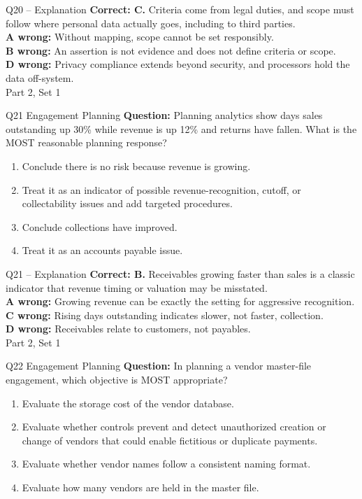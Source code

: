 \documentclass[aspectratio=169,10pt]{beamer}
\begin{document}
\begin{frame}[t]{Q20 -- Explanation}
	\footnotesize
	\textbf{Correct: C.} Criteria come from legal duties, and scope must follow where personal data actually goes, including to third parties. \\[5pt]
\textbf{A wrong:} Without mapping, scope cannot be set responsibly. \\[3pt]
\textbf{B wrong:} An assertion is not evidence and does not define criteria or scope. \\[3pt]
\textbf{D wrong:} Privacy compliance extends beyond security, and processors hold the data off-system. \\[3pt]
	\vfill {\tiny Part 2, Set 1}
\end{frame}
\begin{frame}[t]{Q21 \hfill {\scriptsize Engagement Planning}}
	\small
	\textbf{Question:} Planning analytics show days sales outstanding up 30\% while revenue is up 12\% and returns have fallen. What is the MOST reasonable planning response?
	\begin{enumerate}[label=\Alph*.,itemsep=1pt,topsep=3pt]
			\item Conclude there is no risk because revenue is growing.
			\item Treat it as an indicator of possible revenue-recognition, cutoff, or collectability issues and add targeted procedures.
			\item Conclude collections have improved.
			\item Treat it as an accounts payable issue.
	\end{enumerate}
\end{frame}
\begin{frame}[t]{Q21 -- Explanation}
	\footnotesize
	\textbf{Correct: B.} Receivables growing faster than sales is a classic indicator that revenue timing or valuation may be misstated. \\[5pt]
\textbf{A wrong:} Growing revenue can be exactly the setting for aggressive recognition. \\[3pt]
\textbf{C wrong:} Rising days outstanding indicates slower, not faster, collection. \\[3pt]
\textbf{D wrong:} Receivables relate to customers, not payables. \\[3pt]
	\vfill {\tiny Part 2, Set 1}
\end{frame}
\begin{frame}[t]{Q22 \hfill {\scriptsize Engagement Planning}}
	\small
	\textbf{Question:} In planning a vendor master-file engagement, which objective is MOST appropriate?
	\begin{enumerate}[label=\Alph*.,itemsep=1pt,topsep=3pt]
			\item Evaluate the storage cost of the vendor database.
			\item Evaluate whether controls prevent and detect unauthorized creation or change of vendors that could enable fictitious or duplicate payments.
			\item Evaluate whether vendor names follow a consistent naming format.
			\item Evaluate how many vendors are held in the master file.
	\end{enumerate}
\end{frame}
\end{document}
